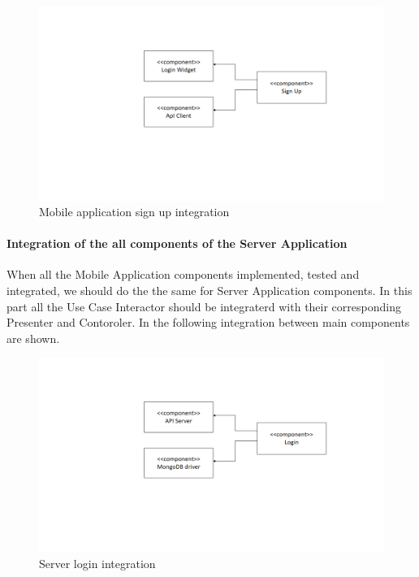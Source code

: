 \begin{figure}[H]
\centering
\includegraphics[width=\textwidth]{Images/SignUpIntegration.png}
\caption{\label{fig:SignUpIntegration}Mobile application sign up integration}
\end{figure}

\paragraph{Integration of the all components of the Server Application}
When all the Mobile Application components implemented, tested and integrated, we should do the the same for Server Application components. In this part all the Use Case Interactor should be integraterd with their corresponding Presenter and Contoroler. In the following integration between main components are shown.

\begin{figure}[H]
\centering
\includegraphics[width=\textwidth]{Images/ServerLoginIntegration.png}
\caption{\label{fig:ServerLoginIntegration}Server login integration}
\end{figure}

